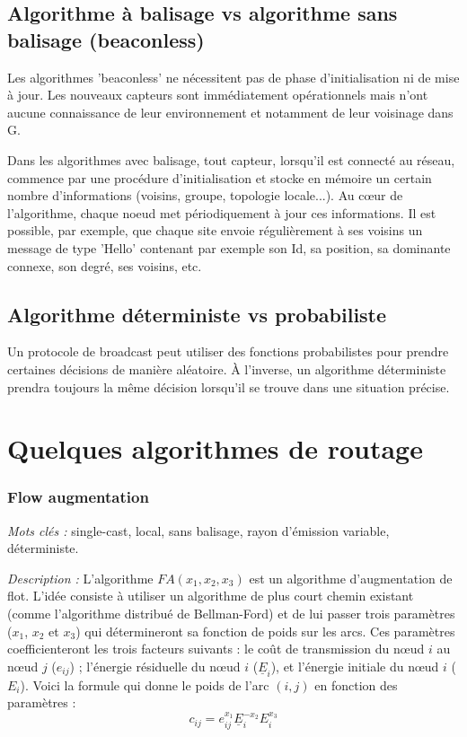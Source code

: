 \subsection{Algorithme à balisage vs algorithme sans balisage (beaconless)}
Les algorithmes 'beaconless' ne nécessitent pas de phase d'initialisation ni de mise à jour. Les nouveaux capteurs sont immédiatement opérationnels mais n'ont aucune connaissance de leur environnement et notamment de leur voisinage dans G. 

Dans les algorithmes avec balisage, tout capteur, lorsqu'il est connecté au réseau, commence par une procédure d'initialisation et stocke en mémoire un certain nombre d'informations (voisins, groupe, topologie locale...). Au cœur de l'algorithme, chaque noeud met périodiquement à jour ces informations. Il est possible, par exemple, que chaque site envoie régulièrement à ses voisins un message de type
'Hello' contenant par exemple son Id, sa position, sa dominante connexe, son degré, ses voisins, etc.



\subsection{Algorithme déterministe vs probabiliste}
Un protocole de broadcast peut utiliser des fonctions probabilistes pour prendre certaines décisions de manière aléatoire.
À l'inverse, un algorithme déterministe prendra toujours la même décision lorsqu'il se trouve dans une situation précise.



\section{Quelques algorithmes de routage}


\subsubsection{Flow augmentation \cite{Chang2000}}
\emph{Mots clés :} single-cast, local, sans balisage, rayon d'émission variable, déterministe.

\emph{Description :}
L'algorithme $FA(x_1, x_2, x_3)$ est un algorithme d'augmentation de flot. L'idée consiste à utiliser un algorithme de plus court chemin existant (comme l'algorithme distribué de Bellman-Ford) et de lui passer trois paramètres ($x_1$, $x_2$ et $x_3$) qui détermineront sa fonction de poids sur les arcs. Ces paramètres coefficienteront les trois facteurs suivants : le coût de transmission du nœud $i$ au nœud $j$ ($e_{ij}$) ; l'énergie résiduelle du nœud $i$ ($\underline{E}_i$), et l'énergie initiale du nœud $i$ ($E_i$). Voici la formule qui donne le poids de l'arc $(i,j)$ en fonction des paramètres :
\begin{displaymath}
c_{ij} = e_{ij}^{x_1} \underline{E}_i^{-x_2} E_i^{x_3}
\end{displaymath}


